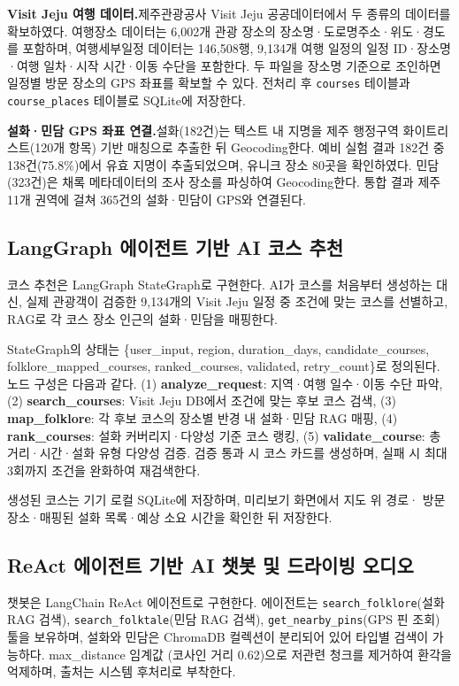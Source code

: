 \documentclass[10pt,twocolumn,a4paper]{article}
\begin{document}
\textbf{Visit Jeju 여행 데이터.}\quad 제주관광공사 Visit Jeju 공공데이터에서
두 종류의 데이터를 확보하였다. 여행장소 데이터는 6,002개 관광 장소의
장소명·도로명주소·위도·경도를 포함하며, 여행세부일정 데이터는 146,508행,
9,134개 여행 일정의 일정 ID·장소명·여행 일차·시작 시간·이동 수단을 포함한다.
두 파일을 장소명 기준으로 조인하면 일정별 방문 장소의 GPS 좌표를 확보할 수
있다. 전처리 후 \texttt{courses} 테이블과 \texttt{course\_places} 테이블로
SQLite에 저장한다.

\textbf{설화·민담 GPS 좌표 연결.}\quad 설화(182건)는 텍스트 내 지명을 제주
행정구역 화이트리스트(120개 항목) 기반 매칭으로 추출한 뒤 Geocoding한다.
예비 실험 결과 182건 중 138건(75.8\%)에서 유효 지명이 추출되었으며, 유니크
장소 80곳을 확인하였다. 민담(323건)은 채록 메타데이터의 조사 장소를 파싱하여
Geocoding한다. 통합 결과 제주 11개 권역에 걸쳐 365건의 설화·민담이 GPS와
연결된다.

\subsection{LangGraph 에이전트 기반 AI 코스 추천}

코스 추천은 LangGraph StateGraph로 구현한다. AI가 코스를 처음부터 생성하는
대신, 실제 관광객이 검증한 9,134개의 Visit Jeju 일정 중 조건에 맞는 코스를
선별하고, RAG로 각 코스 장소 인근의 설화·민담을 매핑한다.

StateGraph의 상태는 \{user\_input, region, duration\_days,
candidate\_courses, folklore\_mapped\_courses, ranked\_courses, validated,
retry\_count\}로 정의된다. 노드 구성은 다음과 같다. (1)
\textbf{analyze\_request}: 지역·여행 일수·이동 수단 파악, (2)
\textbf{search\_courses}: Visit Jeju DB에서 조건에 맞는 후보 코스 검색, (3)
\textbf{map\_folklore}: 각 후보 코스의 장소별 반경 내 설화·민담 RAG 매핑,
(4) \textbf{rank\_courses}: 설화 커버리지·다양성 기준 코스 랭킹, (5)
\textbf{validate\_course}: 총 거리·시간·설화 유형 다양성 검증. 검증 통과 시
코스 카드를 생성하며, 실패 시 최대 3회까지 조건을 완화하여 재검색한다.

생성된 코스는 기기 로컬 SQLite에 저장하며, 미리보기 화면에서 지도 위 경로·
방문 장소·매핑된 설화 목록·예상 소요 시간을 확인한 뒤 저장한다.

\subsection{ReAct 에이전트 기반 AI 챗봇 및 드라이빙 오디오}

챗봇은 LangChain ReAct 에이전트로 구현한다. 에이전트는
\texttt{search\_folklore}(설화 RAG 검색), \texttt{search\_folktale}(민담 RAG
검색), \texttt{get\_nearby\_pins}(GPS 핀 조회) 툴을 보유하며, 설화와 민담은
ChromaDB 컬렉션이 분리되어 있어 타입별 검색이 가능하다. max\_distance 임계값
(코사인 거리 0.62)으로 저관련 청크를 제거하여 환각을 억제하며, 출처는 시스템
후처리로 부착한다.
\end{document}
